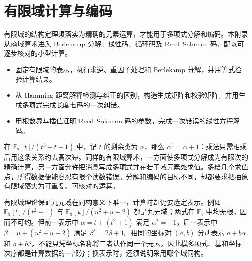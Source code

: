 
\chapter{有限域计算与编码}
\label{b1:app:B}

\begin{chapterabstract}
	有限域的结构定理须落实为精确的元素运算，才能用于多项式分解和编码。本附录从商域算术进入 Berlekamp 分解、线性码、循环码及 Reed--Solomon 码，配以可逐步核对的小型计算。
\end{chapterabstract}

\begin{learninggoals}
	\begin{itemize}
		\item 固定有限域的表示，执行求逆、重因子处理和 Berlekamp 分解，并用等式检验计算结果。
		\item 从 Hamming 距离解释检测与纠正的区别，构造生成矩阵和校验矩阵，并用生成多项式完成长度七码的一次纠错。
		\item 用根数界与插值证明 Reed–Solomon 码的参数，完成一次错误的线性方程解码。
	\end{itemize}

\end{learninggoals}

在 \(\mathbb F_2[t]/(t^3+t+1)\) 中，记 \(t\) 的剩余类为 \(\alpha\)，那么 \(\alpha^3=\alpha+1\)：乘法只需相乘后用这条关系约去高次幂。同样的有限域算术，一方面使多项式分解成为有限次的精确计算，另一方面允许把消息写成多项式并在若干域元素处求值。多给几个求值点，所得数据便能容忍有限个读数错误。分解和编码的目标不同，却都要求把抽象有限域落实为可重复、可核对的运算。

\ProseParagraphBreak

有限域理论保证九元域在同构意义下唯一，计算时却仍要选定表示。例如 \(\mathbb F_3[t]/(t^2+1)\) 与 \(\mathbb F_3[u]/(u^2+u+2)\) 都是九元域；两式在 \(\mathbb F_3\) 中均无根，因而不可约。但前一表示中 \(\alpha=t+(t^2+1)\) 满足 \(\alpha^2=-1\)，后一表示中 \(\beta=u+(u^2+u+2)\) 满足 \(\beta^2=2\beta+1\)。相同的坐标对 \((a,b)\) 分别表示 \(a+b\alpha\) 和 \(a+b\beta\)，不能只凭坐标名称将二者认作同一个元素。因此模多项式、基和坐标次序都是计算数据的一部分；换表示时，还须说明采用哪个域同构。

